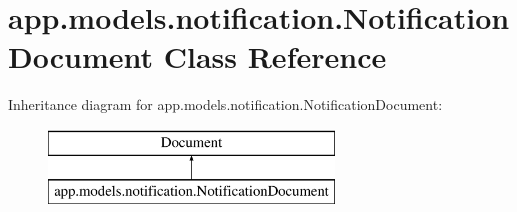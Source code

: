 \hypertarget{classapp_1_1models_1_1notification_1_1_notification_document}{}\section{app.\+models.\+notification.\+Notification\+Document Class Reference}
\label{classapp_1_1models_1_1notification_1_1_notification_document}
Inheritance diagram for app.\+models.\+notification.\+Notification\+Document\+:\begin{figure}[H]
\begin{center}
\leavevmode
\includegraphics[height=2.000000cm]{classapp_1_1models_1_1notification_1_1_notification_document}
\end{center}
\end{figure}
